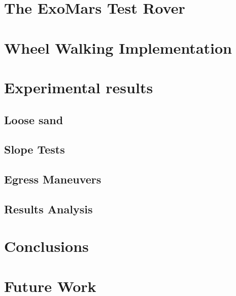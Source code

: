 \documentclass[a4paper,twocolumn]{esapub2005} %
\begin{document}
\section{The ExoMars Test Rover}


\section{Wheel Walking Implementation}


\section{Experimental results}

\subsection{Loose sand}
\subsection{Slope Tests}
\subsection{Egress Maneuvers}
\subsection{Results Analysis}

\section{Conclusions}

\section{Future Work}

\end{document}
